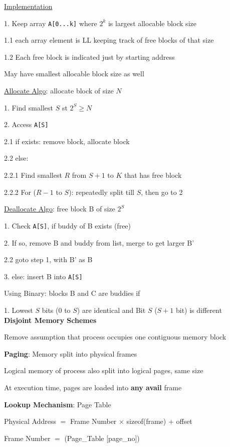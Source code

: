 \documentclass[10pt, a4paper]{article}
\newcommand{\highlight}[1]{{\color{red}\textbf{#1}}}
\newcommand{\red}[1]{{\color{red}#1}}
\newcommand{\green}[1]{{\color{ForestGreen}#1}}
\newcommand{\header}[1]{{\normalsize\textbf{#1}}}
\newcommand{\tab}[0]{\hspace*{2mm}}
\begin{document}
\begin{multicols*}{3}
		\underline{Implementation}

		1. Keep array \texttt{A[0...k]} where $2^k$ is largest allocable block size

		\tab{} 1.1 each array element is LL keeping track of free blocks of that size

		\tab{} 1.2 Each free block is indicated just by starting address

		May have smallest allocable block size as well 

		\underline{Allocate Algo}: allocate block of size $N$

		1. Find smallest $S$ st $2^S \geq N$ 

		2. Access \texttt{A[S]}

		\tab{} 2.1 if exists: remove block, allocate block

		\tab{} 2.2 else:

		\tab{}\tab{} 2.2.1 Find smallest $R$ from $S + 1$ to $K$ that has free block

		\tab{}\tab{} 2.2.2 For ($R-1$ to $S$): repeatedly split till $S$, then go to 2

		\underline{Deallocate Algo}: free block B of size $2^S$

		1. Check \texttt{A[S]}, if buddy of B exists (free)

		2. If so, remove B and buddy from list, merge to get larger B'

		\tab{} 2.2 goto step 1, with B' as B

		3. else: insert B into \texttt{A[S]}

		Using \red{Binary}: blocks B and C are buddies if 

		1. Lowest $S$ bits (0 to $S$) are identical \red{and} Bit $S$ ($S + 1$ bit) is different\\
		
		\header{Disjoint Memory Schemes}

		Remove assumption that process occupies one contiguous memory block

		\textbf{Paging}: Memory split into \red{physical frames}

		Logical memory of process also split into \red{logical pages}, \green{same size}

		At execution time, pages are loaded into \highlight{any avail} frame

		\textbf{Lookup Mechanism}: Page Table

		Physical Address $=$ Frame Number  $\times$ sizeof(frame) $+$ offset

		Frame Number $=$ (Page\_Table [page\_no])


\end{multicols*}
\end{document}
